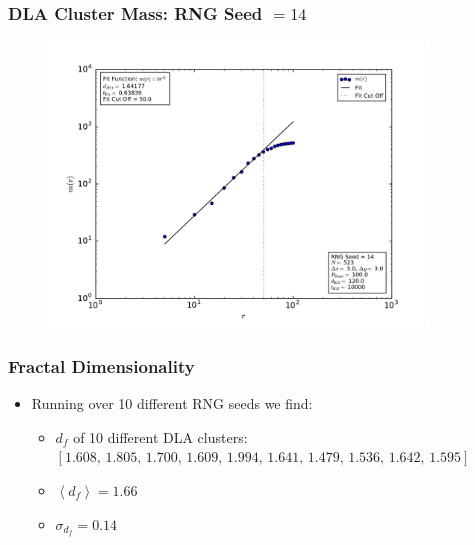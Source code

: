 \documentclass[mathserif,18pt,xcolor=table]{beamer}
\begin{document}
\begin{frame}
  \frametitle{DLA Cluster Mass: RNG Seed $= 14$}
\begin{figure}
  \centering
  \includegraphics[width=0.9\textwidth]{problem_3/large_cluster_mass_seed_num_14.pdf}
\end{figure}
\end{frame}

\begin{frame}
  \frametitle{Fractal Dimensionality}

  \begin{itemize}
    \item Running over 10 different RNG seeds we find:
    \begin{itemize}
      \item $d_f$ of 10 different DLA clusters: $[1.608, \,1.805, \,1.700, \,1.609, \,1.994, \,1.641, \,1.479, \,1.536, \,1.642, \,1.595]$
      \item $\left<d_{f}\right> = 1.66$
      \item $\sigma_{d_f}= 0.14$ 
    \end{itemize}
  \end{itemize}


\end{frame}
\end{document}
